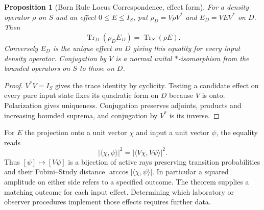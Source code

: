 \documentclass[11pt]{article}
\newtheorem{proposition}{Proposition}[section]
\theoremstyle{definition}
\DeclareMathOperator{\Tr}{Tr}
\begin{document}
\begin{proposition}[Born Rule Locus Correspondence, effect form]
\label{prop:matched-born-probabilities}
For a density operator $\rho$ on $S$ and an effect $0\leq E\leq I_S$, put $\rho_D=V\rho V^*$ and $E_D=VEV^*$ on $D$. Then
\begin{equation}
 \Tr_D(\rho_D E_D)=\Tr_S(\rho E).
 \label{eq:matched-effect-probability}
\end{equation}
Conversely $E_D$ is the unique effect on $D$ giving this equality for every input density operator. Conjugation by $V$ is a normal unital $*$-isomorphism from the bounded operators on $S$ to those on $D$.
\end{proposition}
\begin{proof}
$V^*V=I_S$ gives the trace identity by cyclicity. Testing a candidate effect on every pure input state fixes its quadratic form on $D$ because $V$ is onto. Polarization gives uniqueness. Conjugation preserves adjoints, products and increasing bounded suprema, and conjugation by $V^*$ is its inverse.
\end{proof}

For $E$ the projection onto a unit vector $\chi$ and input a unit vector $\psi$, the equality reads
\[
 |\langle\chi,\psi\rangle|^2=|\langle V\chi,V\psi\rangle|^2 .
\]
Thus $[\psi]\mapsto[V\psi]$ is a bijection of active rays preserving transition probabilities and their Fubini--Study distance $\arccos|\langle\chi,\psi\rangle|$. In particular a squared amplitude on either side refers to a specified outcome. The theorem supplies a matching outcome for each input effect. Determining which laboratory or observer procedures implement those effects requires further data.
\end{document}
